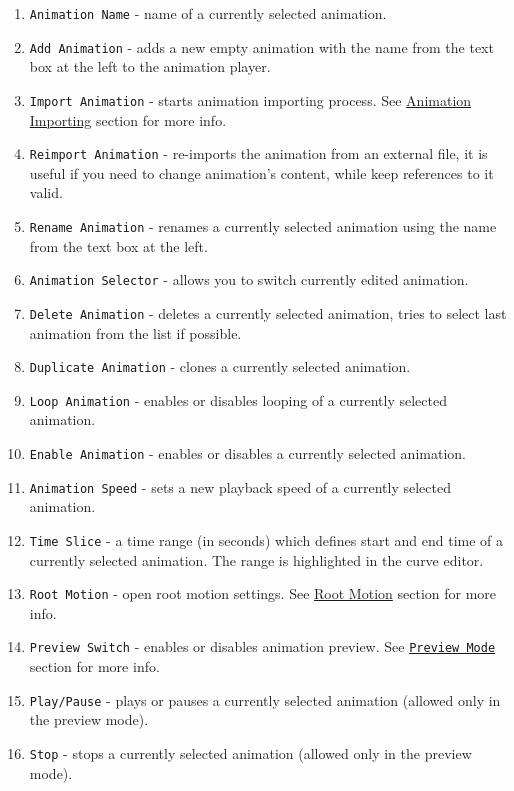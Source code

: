 \documentclass[
]{book}
\providecommand{\tightlist}{%
  \setlength{\itemsep}{0pt}\setlength{\parskip}{0pt}}
\theoremstyle{definition}
\theoremstyle{definition}
\theoremstyle{definition}
\theoremstyle{definition}
\theoremstyle{remark}
\begin{document}
\begin{enumerate}
\def\labelenumi{\arabic{enumi}.}
\tightlist
\item
  \texttt{Animation\ Name} - name of a currently selected animation.
\item
  \texttt{Add\ Animation} - adds a new empty animation with the name from the text box at the left to the animation player.
\item
  \texttt{Import\ Animation} - starts animation importing process. See \hyperref[animation-importing]{Animation Importing} section for more info.
\item
  \texttt{Reimport\ Animation} - re-imports the animation from an external file, it is useful if you need to change animation's content, while keep references to it valid.
\item
  \texttt{Rename\ Animation} - renames a currently selected animation using the name from the text box at the left.
\item
  \texttt{Animation\ Selector} - allows you to switch currently edited animation.
\item
  \texttt{Delete\ Animation} - deletes a currently selected animation, tries to select last animation from the list if possible.
\item
  \texttt{Duplicate\ Animation} - clones a currently selected animation.
\item
  \texttt{Loop\ Animation} - enables or disables looping of a currently selected animation.
\item
  \texttt{Enable\ Animation} - enables or disables a currently selected animation.
\item
  \texttt{Animation\ Speed} - sets a new playback speed of a currently selected animation.
\item
  \texttt{Time\ Slice} - a time range (in seconds) which defines start and end time of a currently selected animation. The range is highlighted in the curve editor.
\item
  \texttt{Root\ Motion} - open root motion settings. See \hyperref[root-motion]{Root Motion} section for more info.
\item
  \texttt{Preview\ Switch} - enables or disables animation preview. See \hyperref[preview-mode]{\texttt{Preview\ Mode}} section for more info.
\item
  \texttt{Play/Pause} - plays or pauses a currently selected animation (allowed only in the preview mode).
\item
  \texttt{Stop} - stops a currently selected animation (allowed only in the preview mode).
\end{enumerate}
\end{document}
